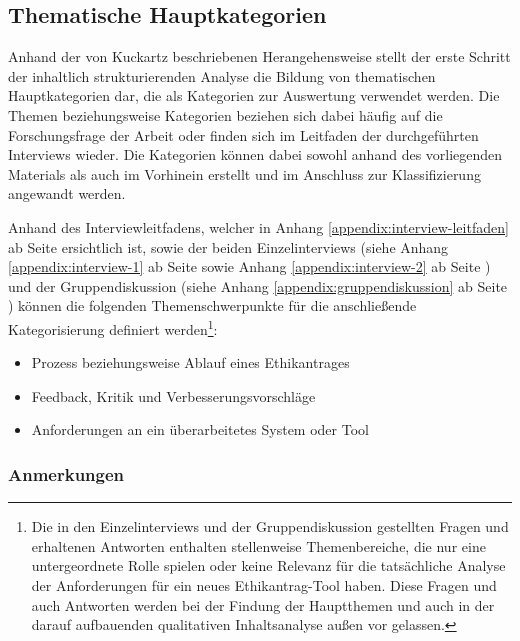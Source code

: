 \documentclass[a4paper,12pt,twoside]{scrreprt}
\begin{document}
\subsection{Thematische Hauptkategorien}
\label{sub-sec:thematische-hauptkategorien}

Anhand der von Kuckartz beschriebenen Herangehensweise stellt der erste Schritt der inhaltlich strukturierenden Analyse die Bildung von thematischen Hauptkategorien dar, die als Kategorien zur Auswertung verwendet werden. Die Themen beziehungsweise Kategorien beziehen sich dabei häufig auf die Forschungsfrage der Arbeit oder finden sich im Leitfaden der durchgeführten Interviews wieder. Die Kategorien können dabei sowohl anhand des vorliegenden Materials als auch im Vorhinein erstellt und im Anschluss zur Klassifizierung angewandt werden. \cite[101\psq]{kuckartz_qualitative_2018}

\medskip

Anhand des Interviewleitfadens, welcher in Anhang \ref{appendix:interview-leitfaden} ab Seite \pageref{appendix:interview-leitfaden} ersichtlich ist, sowie der beiden Einzelinterviews (siehe Anhang \ref{appendix:interview-1} ab Seite \pageref{appendix:interview-1} sowie Anhang \ref{appendix:interview-2} ab Seite \pageref{appendix:interview-2}) und der Gruppendiskussion (siehe Anhang \ref{appendix:gruppendiskussion} ab Seite \pageref{appendix:gruppendiskussion}) können die folgenden Themenschwerpunkte für die anschließende Kategorisierung definiert werden\footnote{Die in den Einzelinterviews und der Gruppendiskussion gestellten Fragen und erhaltenen Antworten enthalten stellenweise Themenbereiche, die nur eine untergeordnete Rolle spielen oder keine Relevanz für die tatsächliche Analyse der Anforderungen für ein neues Ethikantrag-Tool haben. Diese Fragen und auch Antworten werden bei der Findung der Hauptthemen und auch in der darauf aufbauenden qualitativen Inhaltsanalyse außen vor gelassen.}:
\begin{itemize}
    \item Prozess beziehungsweise Ablauf eines Ethikantrages
    \item Feedback, Kritik und Verbesserungsvorschläge
    \item Anforderungen an ein überarbeitetes System oder Tool
\end{itemize}

\subsubsection*{Anmerkungen}
\label{sub-sub-sec:thematische-hauptkategorien-anmerkungen}
\end{document}
